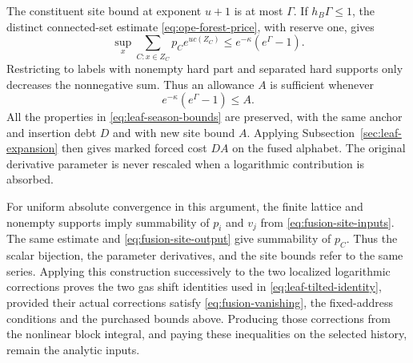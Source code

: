 The constituent site bound at exponent $u+1$ is at most $\Gamma$.
If $h_B\Gamma\le1$, the distinct connected-set estimate
\eqref{eq:ope-forest-price}, with reserve one, gives
\begin{equation}\label{eq:fusion-site-output}
       \sup_x\sum_{C:x\in Z_C}p_Ce^{u c(Z_C)}
                           \le e^{-\kappa}(e^\Gamma-1).
\end{equation}
Restricting to labels with nonempty hard part and separated hard
supports only decreases the nonnegative sum. Thus an allowance $A$
is sufficient whenever
\[
                    e^{-\kappa}(e^\Gamma-1)\le A.
\]
All the properties in \eqref{eq:leaf-season-bounds} are preserved,
with the same anchor and insertion debt $D$ and with new site bound
$A$. Applying Subsection~\ref{sec:leaf-expansion} then gives marked
forced cost $DA$ on the fused alphabet. The original derivative
parameter is never rescaled when a logarithmic contribution is
absorbed.

For uniform absolute convergence in this argument, the finite lattice
and nonempty supports imply summability of $p_i$ and $v_j$ from
\eqref{eq:fusion-site-inputs}. The same estimate and
\eqref{eq:fusion-site-output} give summability of $p_C$. Thus the
scalar bijection, the parameter derivatives, and the site bounds
refer to the same series. Applying this construction successively
to the two localized logarithmic corrections proves the two gas
shift identities used in \eqref{eq:leaf-tilted-identity}, provided
their actual corrections satisfy \eqref{eq:fusion-vanishing}, the
fixed-address conditions and the purchased bounds above. Producing
those corrections from the nonlinear block integral, and paying these
inequalities on the selected history, remain the analytic inputs.
